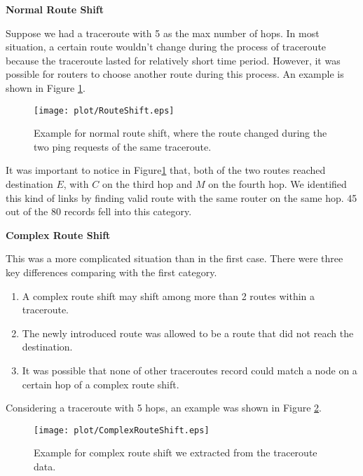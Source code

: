 \documentclass[conference, twocolumn, oneside, 10pt]{IEEEtran}
\begin{document}
\textbf{Normal Route Shift}

Suppose we had a traceroute with 5 as the max number of hops. In most situation, a certain route wouldn't change during the process of traceroute because the traceroute lasted for relatively short time period. However, it was possible for routers to choose another route during this process. An example is shown in Figure \ref{fig:NormalRouteShift}.

\begin{figure}[h!]
  \centering
  \texttt{[image: plot/RouteShift.eps]}
  \caption{Example for normal route shift, where the route changed during the two ping requests of the same traceroute.}
  \label{fig:NormalRouteShift}
\end{figure}

It was important to notice in Figure\ref{fig:NormalRouteShift} that, both of the two routes reached destination $E$, with $C$ on the third hop and $M$ on the fourth hop. We identified this kind of links by finding valid route with the same router on the same hop. 45 out of the 80 records fell into this category.

\textbf{Complex Route Shift}

This was a more complicated situation than in the first case. There were three key differences comparing with the first category.

\begin{enumerate}

\item{} A complex route shift may shift among more than 2 routes within a traceroute.

\item{} The newly introduced route was allowed to be a route that did not reach the destination.

\item{} It was possible that none of other traceroutes record could match a node on a certain hop of a complex route shift.

\end{enumerate}

Considering a traceroute with 5 hops, an example was shown in Figure \ref{fig:ComplexRouteShift}.

\begin{figure}[h!]
  \centering
  \texttt{[image: plot/ComplexRouteShift.eps]}
  \caption{Example for complex route shift we extracted from the traceroute data.}
  \label{fig:ComplexRouteShift}
\end{figure}
\end{document}
